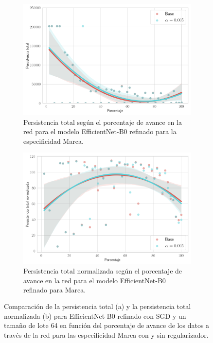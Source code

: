 \begin{figure}[H]
	\centering
	\begin{subfigure}
		{.5\textwidth}
		\centering
		\includegraphics[width=\linewidth]{img/exp_refine_efficientnet.png}
		\caption{Persistencia total según el porcentaje de avance en la red para el
			modelo EfficientNet-B0 refinado para la especificidad Marca.}
		\label{fig:efficientnet-refine-1}
	\end{subfigure}%
	\begin{subfigure}
		{.5\textwidth}
		\centering
		\includegraphics[width=\linewidth]{img/exp_refine_efficientnet_norm.png}
		\caption{Persistencia total normalizada según el porcentaje de avance en la
			red para el modelo EfficientNet-B0 refinado para Marca.}
		\label{fig:efficientnet-refine-2}
	\end{subfigure}
	\caption{Comparación de la persistencia total (a) y la persistencia total
		normalizada (b) para EfficientNet-B0 refinado con SGD y un tamaño de lote 64
		en función del porcentaje de avance de los datos a través de la red para las
		especificidad Marca con y sin regularizador.}
	\label{fig:efficientnet-refine}
\end{figure}

